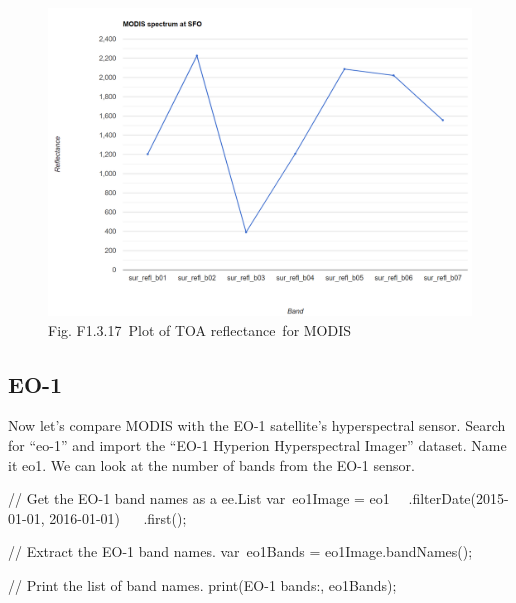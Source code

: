 \documentclass[
  letterpaper,
  DIV=11,
  numbers=noendperiod]{scrreprt}
\newenvironment{Shaded}{\begin{snugshade}}{\end{snugshade}}
\newcommand{\AttributeTok}[1]{\textcolor[rgb]{0.40,0.45,0.13}{#1}}
\newcommand{\CommentTok}[1]{\textcolor[rgb]{0.37,0.37,0.37}{#1}}
\newcommand{\FunctionTok}[1]{\textcolor[rgb]{0.28,0.35,0.67}{#1}}
\newcommand{\NormalTok}[1]{\textcolor[rgb]{0.00,0.23,0.31}{#1}}
\newcommand{\OperatorTok}[1]{\textcolor[rgb]{0.37,0.37,0.37}{#1}}
\newcommand{\StringTok}[1]{\textcolor[rgb]{0.13,0.47,0.30}{#1}}
\begin{document}
\begin{figure}

{\centering \includegraphics{./F1/image50.png}

}

\caption{Fig. F1.3.17~Plot of TOA reflectance~for MODIS}

\end{figure}

\hypertarget{eo-1}{%
\subsection{EO-1}\label{eo-1}}

Now let's compare MODIS with the EO-1 satellite's hyperspectral sensor.
Search for ``eo-1'' and import the ``EO-1 Hyperion Hyperspectral
Imager'' dataset. Name it eo1. We can look at the number of bands from
the EO-1 sensor.

\begin{Shaded}
\begin{Highlighting}[]
\CommentTok{// Get the EO{-}1 band names as a ee.List  }
\NormalTok{var eo1Image }\OperatorTok{=}\NormalTok{ eo1  }\AttributeTok{ }\OperatorTok{.}\FunctionTok{filterDate}\NormalTok{(}\StringTok{\textquotesingle{}2015{-}01{-}01\textquotesingle{}}\OperatorTok{,} \StringTok{\textquotesingle{}2016{-}01{-}01\textquotesingle{}}\NormalTok{)  }
  \AttributeTok{ }\OperatorTok{.}\FunctionTok{first}\NormalTok{()}\OperatorTok{;}  
  
\CommentTok{// Extract the EO{-}1 band names.  }
\NormalTok{var eo1Bands }\OperatorTok{=}\NormalTok{ eo1Image}\OperatorTok{.}\FunctionTok{bandNames}\NormalTok{()}\OperatorTok{;}  
  
\CommentTok{// Print the list of band names.  }
\FunctionTok{print}\NormalTok{(}\StringTok{\textquotesingle{}EO{-}1 bands:\textquotesingle{}}\OperatorTok{,}\NormalTok{ eo1Bands)}\OperatorTok{;}
\end{Highlighting}
\end{Shaded}
\end{document}
